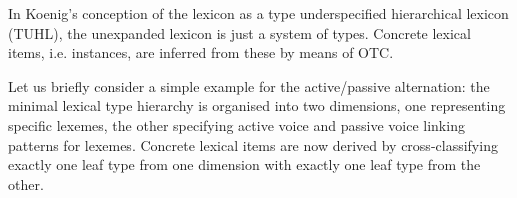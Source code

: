 \documentclass[output=paper
	        ,collection
	        ,collectionchapter
 	        ,biblatex
                ,babelshorthands
                ,newtxmath
                ,draftmode
                ,colorlinks, citecolor=brown
]{langscibook}
\begin{document}
{In Koenig's conception of the lexicon as a type underspecified
hierarchical lexicon (TUHL), the unexpanded lexicon is just a system of
types. Concrete lexical items, i.e. instances, are inferred from these
by means of OTC. 

Let us briefly consider a simple example for the active/passive
alternation: the minimal lexical type hierarchy is organised into two
dimensions, one representing specific lexemes, the other specifying
active voice and passive voice linking patterns for lexemes. Concrete
lexical items are now derived by cross-classifying exactly one leaf
type from one dimension with exactly one leaf type from the other.

\begin{figure}[htb]
  \centering

  \footnotesize

\end{figure}}
\end{document}
